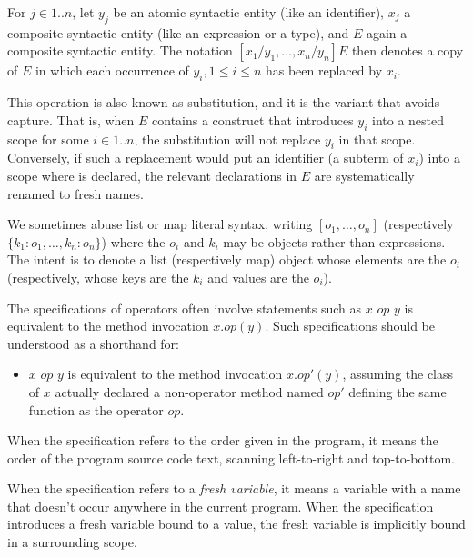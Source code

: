 \documentclass{article}
\begin{document}
\LMHash{}
For $j \in 1 .. n$,
let $y_j$ be an atomic syntactic entity (like an identifier),
$x_j$ a composite syntactic entity (like an expression or a type),
and $E$ again a composite syntactic entity.
The notation $[x_1/y_1, \ldots, x_n/y_n]E$ then denotes a copy of $E$
in which each occurrence of $y_i, 1 \le i \le n$ has been replaced by $x_i$.

\LMHash{}
This operation is also known as substitution, and it is the variant that avoids capture.
That is, when $E$ contains a construct that introduces $y_i$ into a nested scope for some $i \in 1 .. n$,
the substitution will not replace $y_i$ in that scope.
Conversely, if such a replacement would put an identifier \id{} (a subterm of $x_i$) into a scope where \id{} is declared,
the relevant declarations in $E$ are systematically renamed to fresh names.


\LMHash{}
We sometimes abuse list or map literal syntax, writing $[o_1, \ldots, o_n]$ (respectively $\{k_1: o_1, \ldots, k_n: o_n\}$) where the $o_i$ and $k_i$ may be objects rather than expressions.
The intent is to denote a list (respectively map) object whose elements are the $o_i$ (respectively, whose keys are the $k_i$ and values are the $o_i$).

\LMHash{}
The specifications of operators often involve statements such as $x$ $op$ $y$ is equivalent to the method invocation $x.op(y)$.
Such specifications should be understood as a shorthand for:
\begin{itemize}
\item
$x$ $op$ $y$ is equivalent to the method invocation $x.op'(y)$, assuming the class of $x$ actually declared a non-operator method named $op'$ defining the same function as the operator $op$.
\end{itemize}


\LMHash{}
When the specification refers to the order given in the program, it means the order of the program source code text, scanning left-to-right and top-to-bottom.

\LMHash{}
When the specification refers to a {\em fresh variable}, it means a variable with a name that doesn't occur anywhere in the current program.
When the specification introduces a fresh variable bound to a value, the fresh variable is implicitly bound in a surrounding scope.
\end{document}

